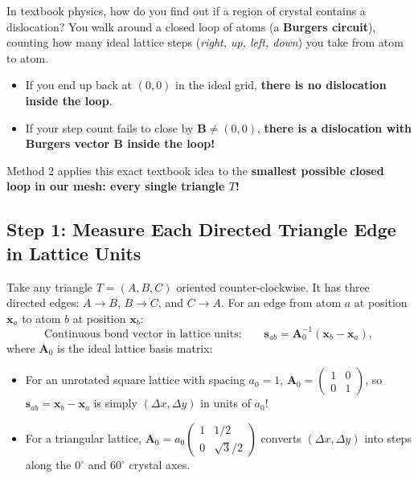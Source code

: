 \documentclass[11pt,a4paper]{article}
\begin{document}
In textbook physics, how do you find out if a region of crystal contains a dislocation?
You walk around a closed loop of atoms (a \textbf{Burgers circuit}), counting how many ideal
lattice steps (\emph{right, up, left, down}) you take from atom to atom.
\begin{itemize}[noitemsep]
  \item If you end up back at $(0,0)$ in the ideal grid, \textbf{there is no dislocation inside the loop}.
  \item If your step count fails to close by $\bm{B} \neq (0,0)$, \textbf{there is a dislocation with Burgers vector $\bm{B}$ inside the loop!}
\end{itemize}

Method 2 applies this exact textbook idea to the \textbf{smallest possible closed loop in our mesh:
every single triangle $T$!}

\subsection{Step 1: Measure Each Directed Triangle Edge in Lattice Units}
Take any triangle $T = (A, B, C)$ oriented counter-clockwise. It has three directed edges:
$A \to B$, $B \to C$, and $C \to A$.
For an edge from atom $a$ at position $\bm{x}_a$ to atom $b$ at position $\bm{x}_b$:
\begin{equation}
  \text{Continuous bond vector in lattice units:}\qquad
  \bm{s}_{ab} = \bm{A}_0^{-1}(\bm{x}_b - \bm{x}_a),
\end{equation}
where $\bm{A}_0$ is the ideal lattice basis matrix:
\begin{itemize}[noitemsep]
  \item For an unrotated square lattice with spacing $a_0 = 1$, $\bm{A}_0 = \begin{pmatrix} 1 & 0 \\ 0 & 1 \end{pmatrix}$, so $\bm{s}_{ab} = \bm{x}_b - \bm{x}_a$ is simply $(\Delta x, \Delta y)$ in units of $a_0$!
  \item For a triangular lattice, $\bm{A}_0 = a_0 \begin{pmatrix} 1 & 1/2 \\ 0 & \sqrt{3}/2 \end{pmatrix}$ converts $(\Delta x, \Delta y)$ into steps along the $0^\circ$ and $60^\circ$ crystal axes.
\end{itemize}
\end{document}
